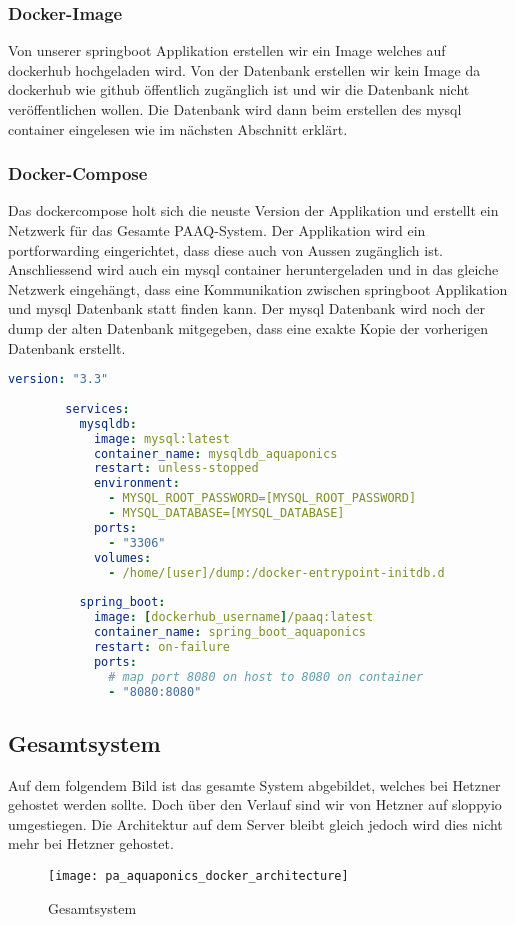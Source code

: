 \documentclass[../main.tex]{subfiles}
\begin{document}
	\subsubsection{Docker-Image}
	Von unserer \gls{springboot} Applikation erstellen wir ein Image welches auf \gls{dockerhub} hochgeladen wird. Von der Datenbank erstellen wir kein Image da \gls{dockerhub} wie \gls{github} öffentlich zugänglich ist und wir die Datenbank nicht veröffentlichen wollen. Die Datenbank wird dann beim erstellen des \gls{mysql} \gls{container} eingelesen wie im nächsten Abschnitt erklärt.
	
	\subsubsection{Docker-Compose}
	Das \gls{dockercompose} holt sich die neuste Version der Applikation und erstellt ein Netzwerk für das Gesamte PAAQ-System. Der Applikation wird ein \gls{portforwarding} eingerichtet, dass diese auch von Aussen zugänglich ist. Anschliessend wird auch ein \gls{mysql} \gls{container} heruntergeladen und in das gleiche Netzwerk eingehängt, dass eine Kommunikation zwischen \gls{springboot} Applikation und \gls{mysql} Datenbank statt finden kann. Der \gls{mysql} Datenbank wird noch der \gls{dump} der alten Datenbank mitgegeben, dass eine exakte Kopie der vorherigen Datenbank erstellt.
	\begin{lstlisting}[language=yaml]
		version: "3.3"
		
		services:
		  mysqldb:
		    image: mysql:latest
		    container_name: mysqldb_aquaponics
		    restart: unless-stopped
		    environment:
		      - MYSQL_ROOT_PASSWORD=[MYSQL_ROOT_PASSWORD]
		      - MYSQL_DATABASE=[MYSQL_DATABASE]
		    ports:
		      - "3306"
		    volumes:
		      - /home/[user]/dump:/docker-entrypoint-initdb.d
		      
		  spring_boot:
		    image: [dockerhub_username]/paaq:latest
		    container_name: spring_boot_aquaponics
		    restart: on-failure
		    ports:
		      # map port 8080 on host to 8080 on container
		      - "8080:8080"
	\end{lstlisting}

	\subsection{Gesamtsystem}
	Auf dem folgendem Bild ist das gesamte System abgebildet, welches bei Hetzner gehostet werden sollte. Doch über den Verlauf sind wir von Hetzner auf \gls{sloppyio} umgestiegen. Die Architektur auf dem Server bleibt gleich jedoch wird dies nicht mehr bei Hetzner gehostet.
	\begin{figure}[H]
		\centering
		\texttt{[image: pa\_aquaponics\_docker\_architecture]}
		\caption{Gesamtsystem}
		\label{fig:Gesamtsystem}
	\end{figure}
	
\end{document}
